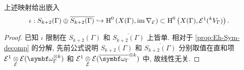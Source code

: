 \begin{lemma}\label{prop:Eichler-Shimura-indep}
	上述映射给出嵌入
	\[ \iota: S_{k+2}(\Gamma) \oplus \overline{S_{k+2}(\Gamma)} \hookrightarrow \operatorname{H}^0\left(X(\Gamma), \operatorname{im}\nabla_{\mathcal{E}}\right) \subset \operatorname{H}^0\left(X(\Gamma), \mathcal{E}^1({}^k V_\Gamma)\right). \]
\end{lemma}
\begin{proof}
	已知 $\iota$ 限制在 $S_{k+2}(\Gamma)$ 和 $\overline{S_{k+2}(\Gamma)}$ 上皆单. 相对于 \eqref{prop:Eh-Sym-decomp} 的分解, 先前公式说明 $S_{k+2}(\Gamma)$ 和 $\overline{S_{k+2}(\Gamma)}$ 分别取值在直和项 $\mathcal{E}^1 \dotimes{\mathcal{E}} \mathcal{E}(\bomega_\Gamma^{\otimes k})$ 和 $\mathcal{E}^1 \dotimes{\mathcal{E}} \mathcal{E}(\overline{\bomega_\Gamma}^{\otimes k})$ 中, 故线性无关.
\end{proof}

